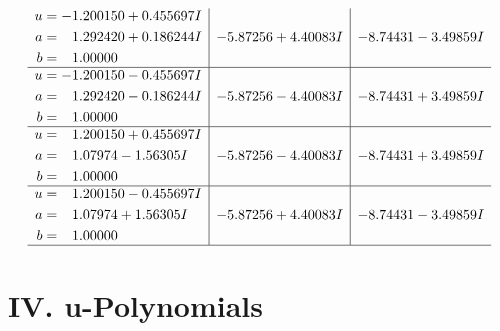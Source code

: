 \documentclass[1p]{elsarticle_modified}
\theoremstyle{definition}
\begin{document}
$$\begin{array}{c|c|c}
\begin{aligned}
u &= -1.200150 + 0.455697 I \\
a &= \phantom{-}1.292420 + 0.186244 I \\
b &= \phantom{-}1.00000\phantom{ +0.000000I}\end{aligned}
 & -5.87256 + 4.40083 I & -8.74431 - 3.49859 I \\ \hline\begin{aligned}
u &= -1.200150 - 0.455697 I \\
a &= \phantom{-}1.292420 - 0.186244 I \\
b &= \phantom{-}1.00000\phantom{ +0.000000I}\end{aligned}
 & -5.87256 - 4.40083 I & -8.74431 + 3.49859 I \\ \hline\begin{aligned}
u &= \phantom{-}1.200150 + 0.455697 I \\
a &= \phantom{-}1.07974 - 1.56305 I \\
b &= \phantom{-}1.00000\phantom{ +0.000000I}\end{aligned}
 & -5.87256 - 4.40083 I & -8.74431 + 3.49859 I \\ \hline\begin{aligned}
u &= \phantom{-}1.200150 - 0.455697 I \\
a &= \phantom{-}1.07974 + 1.56305 I \\
b &= \phantom{-}1.00000\phantom{ +0.000000I}\end{aligned}
 & -5.87256 + 4.40083 I & -8.74431 - 3.49859 I\\
 \hline 
 \end{array}$$\newpage
\newpage\renewcommand{\arraystretch}{1}
\centering \section*{ IV. u-Polynomials}
\end{document}
